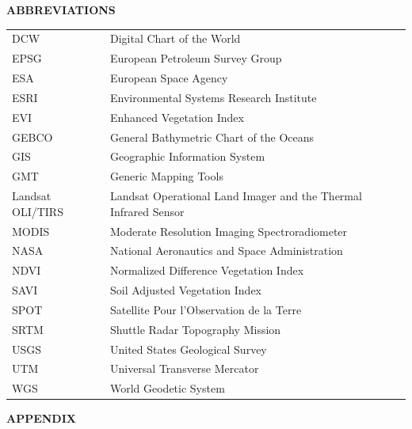 \documentclass[12pt,a4paper,oneside]{article}
\def \newsection{\vspace{12pt}\textbf}
\begin{document}
\vspace{12pt}

\newsection {ABBREVIATIONS}
\vspace{12pt}

\begin{tabular}{@{}ll}
DCW & Digital Chart of the World \\
EPSG & European Petroleum Survey Group \\
ESA & European Space Agency \\
ESRI & Environmental Systems Research Institute \\
EVI & Enhanced Vegetation Index \\
GEBCO & General Bathymetric Chart of the Oceans \\
GIS & Geographic Information System \\
GMT & Generic Mapping Tools \\
Landsat OLI/TIRS & Landsat Operational Land Imager and the Thermal Infrared Sensor \\
MODIS & Moderate Resolution Imaging Spectroradiometer \\
NASA & National Aeronautics and Space Administration \\
NDVI & Normalized Difference Vegetation Index \\
SAVI & Soil Adjusted Vegetation Index \\
SPOT & Satellite Pour l'Observation de la Terre \\
SRTM & Shuttle Radar Topography Mission \\
USGS & United States Geological Survey \\
UTM & Universal Transverse Mercator \\
WGS & World Geodetic System \\
\end{tabular}

\vspace{12pt}

\newsection {APPENDIX}
\vspace{12pt}
\end{document}
